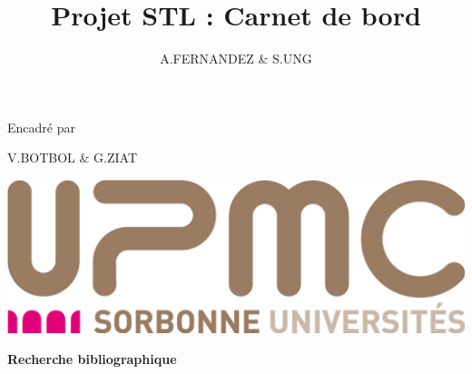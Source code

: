 \title{Projet STL : Carnet de bord}
\author{A.FERNANDEZ \& S.UNG}
\maketitle
\thispagestyle{empty}

\begin{center}
Encadré par

V.BOTBOL \& G.ZIAT
\end{center}

\hrulefill
\vspace*{1cm}
\begin{center}
\includegraphics[scale=0.15]{images/logo_upmc.jpg}%
\end{center}
\vspace*{1cm}
\hrulefill

\begin{center}\bfseries\Huge
  Recherche bibliographique
\end{center}